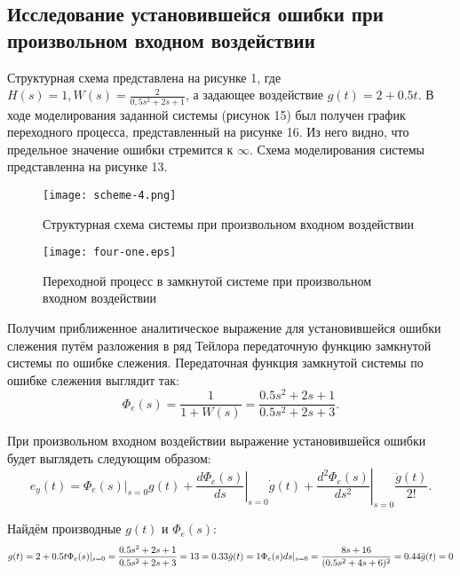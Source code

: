 \documentclass[a4paper,12pt]{article} %
\begin{document}
\newpage
\begin{center}
\section{Исследование установившейся ошибки при произвольном входном воздействии}
\end{center}\par
 Структурная схема представлена на рисунке 1, где $H(s) = 1, W(s) = \displaystyle{\frac{2}{0,5s^2 + 2s + 1}}$, а задающее воздействие $g(t) = {2 + 0.5t}$.
 В ходе моделирования заданной системы (рисунок 15) был получен график переходного процесса, представленный на рисунке 16. Из него видно, что предельное значение ошибки стремится к $\infty$. Схема моделирования системы представленна на рисунке 13.
\begin{figure}[H]
    \centering
    \texttt{[image: scheme-4.png]}
    \caption{Структурная схема системы при произвольном входном воздействии}
\end{figure}
\begin{figure}[H]
    \centering
    \texttt{[image: four-one.eps]}
    \caption{Переходной процесс в замкнутой системе при произвольном входном воздействии}
\end{figure}
Получим приближенное аналитическое выражение для установившейся ошибки слежения путём разложения в ряд Тейлора передаточную функцию замкнутой системы по ошибке слежения.
Передаточная функция замкнутой системы по ошибке слежения выглядит так:
\begin{equation}
   \Phi_e(s) = \frac{1}{1 + W(s)} = \frac{0.5s^2 + 2s + 1}{0.5s^2 + 2s + 3}.
\end{equation}\par
При произвольном входном воздействии выражение установившейся ошибки будет выглядеть следующим образом:
\begin{equation}
    e_y(t) = \Phi_e(s)|_{s=0}g(t) + \left.\frac{d\Phi_e(s)}{ds}\right|_{s=0}\dot{g}(t) + \left.\frac{d^2\Phi_e(s)}{ds^2}\right|_{s=0}\frac{\ddot{g}(t)}{2!}.
\end{equation}\par
Найдём производные $g(t)$ и $\Phi_e(s)$:
\begin{equation}
    g(t) = {2 + 0.5t} 
    \Phi_e(s)|_{s=0} = \frac{0.5s^2 + 2s + 1}{0.5s^2 + 2s + 3} = {1}{3} = 0.33 \\
    \dot{g}(t) = {1} 
    \Phi_e(s){ds}|_{s=0} = \frac{8s + 16}{(0.5s^2 + 4s + 6)^2} = {0.44} \\
    \ddot{g}(t) = {0} \\
\end{equation}
\end{document}
